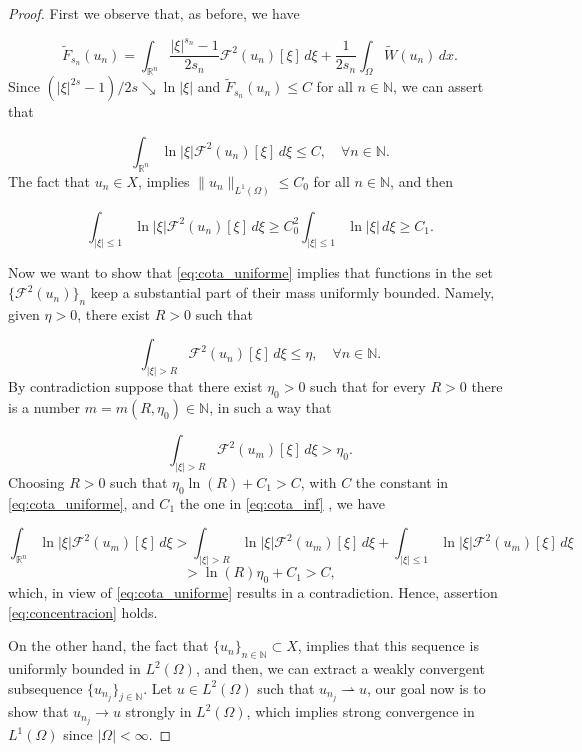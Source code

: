 \documentclass{amsart}
\newcommand{\rn}{{\mathbb{R}^n}}
\newcommand{\Fu}{\mathcal{F}}
\newcommand{\W}{\Omega}
\def\N{{\mathbb {N}}}
\theoremstyle{remark}
\theoremstyle{definition}
\numberwithin{equation}{section}
\begin{document}
\begin{proof}
First we observe that, as before, we have

$$ \tilde{F}_{s_n}(u_n) = \int_{\rn} \frac{|\xi|^{s_n}-1}{2s_n}\Fu^2(u_n)[\xi] \, d\xi +  \frac{1}{2s_n}\int_{\W} \tilde{W}(u_n) \, dx.$$
Since $(|\xi|^{2s} - 1)/2s \searrow \ln{|\xi|}$ and $\tilde{F}_{s_n}(u_n) \leq C$ for all $n \in \N$, we can assert that

\begin{equation}
\label{eq:cota_uniforme}
\int_{\rn} \ln|\xi|\Fu^2(u_n)[\xi] \, d\xi \leq C, \quad \forall n \in \N.
\end{equation}
The fact that $u_{n} \in X$, implies $\|u_{n}\|_{L^1(\W)} \leq C_0$ for all $n \in \N$, and then 

\begin{equation}
\label{eq:cota_inf}
\int_{|\xi|\leq 1} \ln|\xi|\Fu^2(u_n)[\xi] \, d\xi \geq C^2_0\int_{|\xi|\leq 1} \ln|\xi| \, d\xi \geq C_1.
\end{equation}
 
Now we want to show that \eqref{eq:cota_uniforme} implies that functions in the set $\{\Fu^2(u_n)\}_n$ keep a substantial part of their mass uniformly  bounded. Namely, given $\eta > 0$, there exist $R>0$ such that 

\begin{equation}
\label{eq:concentracion}
\int_{|\xi|>R} \Fu^2(u_n)[\xi] \, d\xi \leq \eta, \quad \forall n \in \N.
\end{equation} 
By contradiction suppose that there exist $\eta_0 > 0$ such that for every $R>0$ there is a number $m = m(R,\eta_0) \in \N$, in such a way that 

$$\int_{|\xi|>R} \Fu^2(u_m)[\xi] \, d\xi > \eta_0.$$
Choosing $R>0$ such that $\eta_0 \ln (R) + C_1 > C$, with $C$ the constant in \eqref{eq:cota_uniforme}, and $C_1$ the one in \eqref{eq:cota_inf} , we have

$$\int_{\rn} \ln|\xi|\Fu^2(u_m)[\xi] \, d\xi > \int_{|\xi|>R} \ln|\xi|\Fu^2(u_m)[\xi] \, d\xi + \int_{|\xi|\leq 1} \ln|\xi|\Fu^2(u_m)[\xi] \, d\xi $$ 
$$ >  \ln(R)\eta_0 + C_1 > C,$$
which, in view of \eqref{eq:cota_uniforme} results in a contradiction. Hence, assertion \eqref{eq:concentracion} holds. 

On the other hand, the fact that $\{u_n\}_{n \in \N} \subset X$, implies that this sequence is uniformly bounded in $L^2(\W)$, and then, we can extract a weakly convergent subsequence $\{u_{n_j}\}_{j \in \N}$. Let $u \in L^2(\W)$ such that $u_{n_j} \rightharpoonup u$, our goal now is to show that $u_{n_j} \to u$ strongly in $L^{2}(\W)$, which implies strong convergence in $L^1(\W)$  since $|\W|<\infty$.  


\end{proof}
\end{document}
